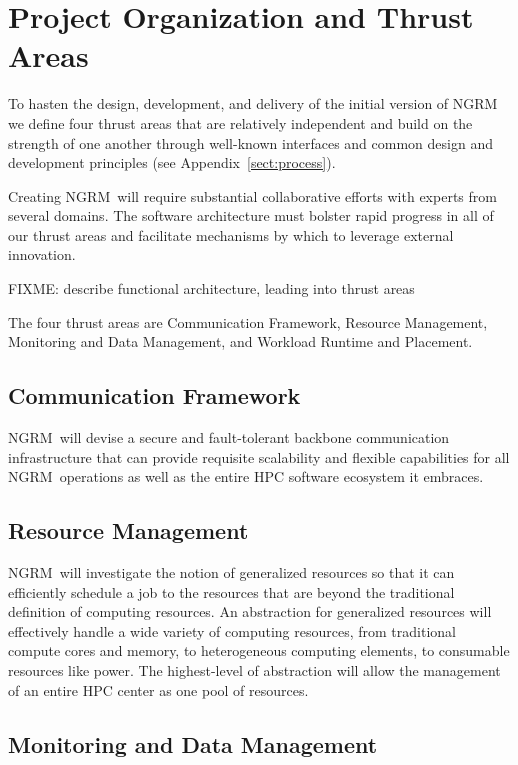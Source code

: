\documentclass{article}
\newcommand{\ngrm}{NGRM}
\begin{document}
\section{Project Organization and Thrust Areas}
\label{sect:projorg}
To hasten the design, development, and delivery of the initial version
of \ngrm\, we define four thrust areas that are relatively independent
and build on the strength of one another through well-known interfaces
and common design and development principles (see Appendix~\ref{sect:process}).

Creating \ngrm\ will require substantial collaborative efforts with
experts from several domains.
The software architecture must bolster rapid progress in all of our thrust
areas and facilitate mechanisms by which to leverage external innovation.

FIXME: describe functional architecture, leading into thrust areas

The four thrust areas are
Communication Framework,
Resource Management,
Monitoring and Data Management,
and Workload Runtime and Placement.

\subsection{Communication Framework}
\ngrm\ will devise a secure and fault-tolerant backbone communication
infrastructure that can provide requisite scalability and flexible
capabilities for all \ngrm\ operations as well as the entire HPC
software ecosystem it embraces.

\subsection{Resource Management}

\ngrm\ will investigate the notion of generalized resources so that
it can efficiently schedule a job to the resources that are beyond the
traditional definition of computing resources. An abstraction for
generalized resources will effectively handle a wide variety of computing
resources, from traditional compute cores and memory, to heterogeneous
computing elements, to consumable resources like power.
The highest-level of abstraction will allow the management of an
entire HPC center as one pool of resources.

\subsection{Monitoring and Data Management}
\end{document}
